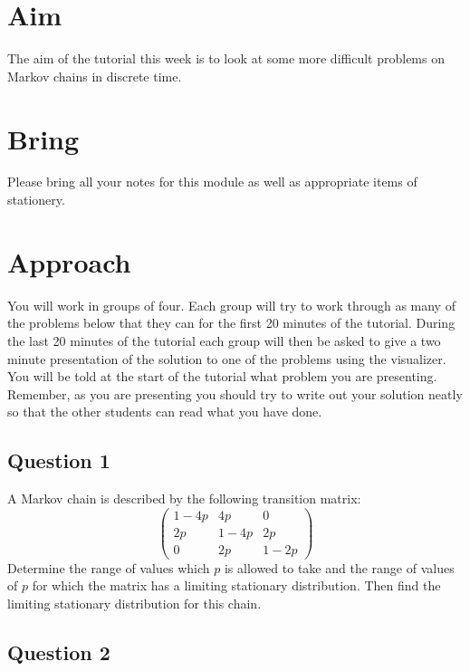 \documentclass[a4paper]{article}
\begin{document}
\section{Aim}

The aim of the tutorial this week is to look at some more difficult problems on Markov chains in discrete time.

\section{Bring}

Please bring all your notes for this module as well as appropriate items of stationery.

\section{Approach}

You will work in groups of four.  Each group will try to work through as many of the problems below that they can for the first 20 minutes of the tutorial.  During the last 20 minutes of the tutorial 
each group will then be asked to give a two minute presentation of the solution to one of the problems using the visualizer.  You will be told at the start of the tutorial what problem you are 
presenting.  Remember, as you are presenting you should try to write out your solution neatly so that the other students can read what you have done.

\subsection{Question 1}

A Markov chain is described by the following transition matrix:
$$
 \left(
 \begin{matrix}
  1 - 4p & 4p & 0 \\
  2p & 1 - 4p & 2p \\
  0 & 2p & 1 - 2p
 \end{matrix}
 \right)
$$
Determine the range of values which $p$ is allowed to take and the
range of values of $p$ for which the matrix has a limiting stationary
distribution.  Then find the limiting stationary distribution for this
chain.

\subsection{Question 2}
\end{document}
